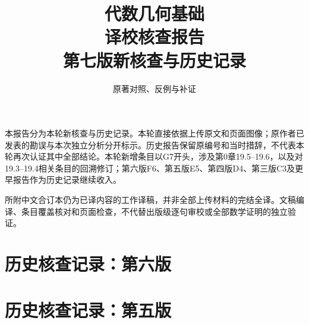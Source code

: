 
\newcommand{\RR}{\mathcal R}
\newcommand{\FF}{\mathcal F}
\newcommand{\GG}{\mathcal G}
\newcommand{\MM}{\mathcal M}
\newcommand{\JJ}{\mathcal J}
\newcommand{\oldauditsrc}[1]{\par\noindent\textbf{原文位置：}#1。\par}
\newcommand{\kind}[2]{\noindent\textbf{分类：#1。}\ #2\par}
\newcommand{\lead}[1]{\par\noindent\textbf{#1}\quad}
\newenvironment{analysisproof}{\par\noindent\textbf{该轮核查的反例或补证。}\ }{\par}

\title{代数几何基础\\译校核查报告\\[1em]\large 第七版新核查与历史记录}
\author{原著对照、反例与补证}
\date{}

\frontmatter
\maketitle
{}
本报告分为本轮新核查与历史记录。本轮直接依据上传原文和页面图像；原作者已发表的勘误与本次独立分析分开标示。历史报告保留原编号和当时措辞，不代表本轮再次认证其中全部结论。本轮新增条目以G7开头，涉及第0章19.5--19.6，以及对19.3--19.4相关条目的回溯修订；第六版F6、第五版E5、第四版D4、第三版C3及更早报告作为历史记录继续收入。

所附中文合订本仍为已译内容的工作译稿，并非全部上传材料的完结全译。文稿编译、条目覆盖核对和页面检查，不代替出版级逐句审校或全部数学证明的独立验证。
\tableofcontents
\mainmatter

\part*{历史核查记录：第六版}

\part*{历史核查记录：第五版}


